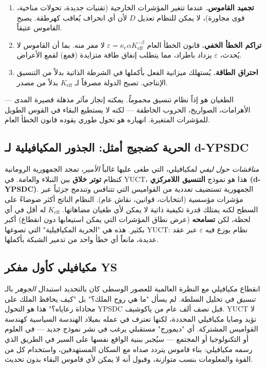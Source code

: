 \documentclass[12pt,a4paper]{article}
\newcommand{\Keff}{K_{\mathrm{eff}}}
\begin{document}
	\begin{enumerate}[leftmargin=*]
		\item \textbf{تجميد القاموس.} عندما تتغير المؤشرات الخارجية (تقنيات جديدة، تحولات مناخية، قوى مجاورة)، لا يمكن للنظام تعديل \(D\) لأن أي انحراف يُعاقب كهرطقة. يصبح القاموس عتيقاً.
		\item \textbf{تراكم الخطأ الخفي.} قانون الخطأ العام \(\varepsilon = \kappa_c \alpha \Keff^{-\beta}\) لا مفر منه. بما أن القاموس لا يُحدث، \(\varepsilon\) يزداد باطراد، مما يتطلب إنفاق طاقة متزايدة (قمع) لقمع الأعراض.
		\item \textbf{احتراق الطاقة.} يُستهلك ميزانية الفعل بأكملها في الشرطة الذاتية بدلاً من التنسيق الإنتاجي. تصبح الدولة مصرفاً لـ \(K_{\mathrm{eff}}\) بدلاً من مصدر.
	\end{enumerate}
	
	الطغيان هو إذاً نظام تنسيق \emph{محموماً}. يمكنه إنجاز مآثر مذهلة قصيرة المدى — الأهرامات، الصواريخ، الحروب الخاطفة — لكنه لا يستطيع البقاء في القوس الطويل للمؤشرات المتغيرة. انهياره هو تحول طوري يقوده قانون الخطأ العام.
	
	\subsection{الحرية كضجيج أمثل: الجذور المكيافيلية لـ d-YPSDC}
	
	\emph{مناقشات حول ليفي} لمكيافيلي، التي طغى عليها غالباً \emph{الأمير}، تمجد الجمهورية الرومانية كنظام \textbf{توتر خلاق} بين النبلاء والعامة. في YUCT، هذا هو نموذج \textbf{التنسيق اللامركزي (d-YPSDC)}. الجمهورية تستضيف تعددية من القواميس التي تتنافس وتندمج جزئياً عبر مؤشرات مؤسسية (انتخابات، قوانين، نقاش عام). النظام الناتج أكثر ضوضاءً على السطح لكنه يمتلك قدرة تكيفية ذاتية لا يمكن لأي طغيان مضاهاتها. \(K_{\mathrm{eff}}\) له أقل في أي لحظة، لكن \textbf{تسامحه} (عرض نطاق المؤشرات التي يمكن استيعابها دون انقطاع) أكبر بكثير. هذه هي "الحرية المكيافيلية" التي تصوغها YUCT: نظام يوزع فيه \(\varepsilon\) عبر عقد عديدة، مانعاً أي خطأ واحد من تدمير الشبكة بأكملها.
	
	\subsection{مكيافيلي كأول مفكر YS}
	
	انقطاع مكيافيلي مع النظرة العالمية للعصور الوسطى كان بالتحديد استبدال \emph{الجوهر} بالـ \emph{تنسيق} في تحليل السلطة. لم يسأل "ما هي روح الملك؟" بل "كيف يحافظ الملك على محاذاة رعاياه؟" هذا هو التحول YPSDC قبل نصف ألف عام من ياكوشيف. YUCT لا تؤيد وصايا مكيافيلي المحددة، لكنها تعترف في عمله بميلاد الهندسة السياسية كهندسة القواميس المشتركة. أي "ديمورج" مستقبلي يرغب في نشر نموذج جديد — في العلوم أو التكنولوجيا أو المجتمع — سيُجبر ببنية الواقع نفسها على السير في الطريق الذي رسمه مكيافيلي: بناء قاموس يتردد صداه مع السكان المستهدفين، واستخدام كل من القوة والمعلومات بنسب متوازنة، وقبول أنه لا يمكن لأي قاموس البقاء بدون تحديث.
	
\end{document}
